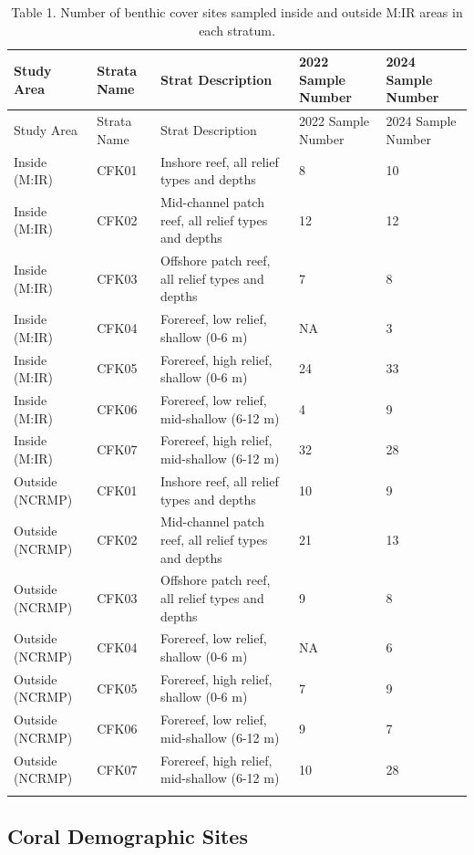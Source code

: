 \documentclass[
]{article}
\begin{document}
\begin{longtable}[]{@{}lllll@{}}
\caption{Table 1. Number of benthic cover sites sampled inside and
outside M:IR areas in each stratum.}\tabularnewline
\toprule()
Study Area & Strata Name & Strat Description & 2022 Sample Number & 2024
Sample Number \\
\midrule()
\endfirsthead
\toprule()
Study Area & Strata Name & Strat Description & 2022 Sample Number & 2024
Sample Number \\
\midrule()
\endhead
Inside (M:IR) & CFK01 & Inshore reef, all relief types and depths & 8 &
10 \\
Inside (M:IR) & CFK02 & Mid-channel patch reef, all relief types and
depths & 12 & 12 \\
Inside (M:IR) & CFK03 & Offshore patch reef, all relief types and depths
& 7 & 8 \\
Inside (M:IR) & CFK04 & Forereef, low relief, shallow (0-6 m) & NA &
3 \\
Inside (M:IR) & CFK05 & Forereef, high relief, shallow (0-6 m) & 24 &
33 \\
Inside (M:IR) & CFK06 & Forereef, low relief, mid-shallow (6-12 m) & 4 &
9 \\
Inside (M:IR) & CFK07 & Forereef, high relief, mid-shallow (6-12 m) & 32
& 28 \\
Outside (NCRMP) & CFK01 & Inshore reef, all relief types and depths & 10
& 9 \\
Outside (NCRMP) & CFK02 & Mid-channel patch reef, all relief types and
depths & 21 & 13 \\
Outside (NCRMP) & CFK03 & Offshore patch reef, all relief types and
depths & 9 & 8 \\
Outside (NCRMP) & CFK04 & Forereef, low relief, shallow (0-6 m) & NA &
6 \\
Outside (NCRMP) & CFK05 & Forereef, high relief, shallow (0-6 m) & 7 &
9 \\
Outside (NCRMP) & CFK06 & Forereef, low relief, mid-shallow (6-12 m) & 9
& 7 \\
Outside (NCRMP) & CFK07 & Forereef, high relief, mid-shallow (6-12 m) &
10 & 28 \\
& & & & \\
\bottomrule()
\end{longtable}

\hypertarget{coral-demographic-sites}{%
\subsection{Coral Demographic Sites}\label{coral-demographic-sites}}
\end{document}
